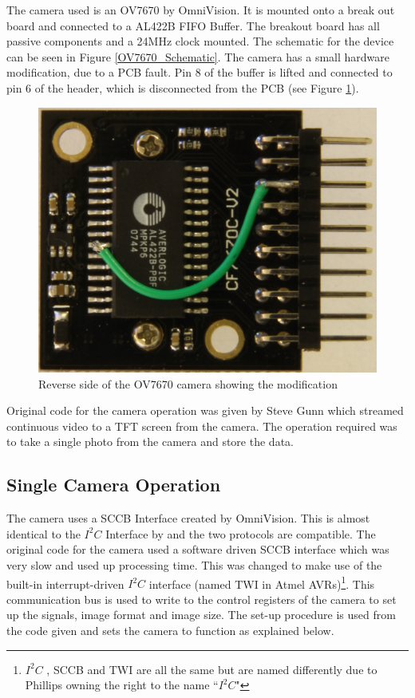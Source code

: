 The camera used is an OV7670 by OmniVision. It is mounted onto a break out board and connected to a AL422B FIFO Buffer. The breakout board has all passive components and a 24MHz clock mounted. The schematic for the device can be seen in Figure \ref{OV7670_Schematic}. The camera has a small hardware modification, due to a PCB fault. Pin 8 of the buffer is lifted and connected to pin 6 of the header, which is disconnected from the PCB (see Figure \ref{fig:OV7670:Mod}).
\begin{figure}
\centering
\includegraphics[width=\textwidth /4]{Figures/OV7670_Back.jpg}
\caption{Reverse side of the OV7670 camera showing the modification}
\label{fig:OV7670:Mod}
\end{figure}
Original code for the camera operation was given by Steve Gunn which streamed continuous video to a TFT screen from the camera. The operation required was to take a single photo from the camera and store the data. 

\subsection{Single Camera Operation}

The camera uses a SCCB Interface \citep{SCCB_Interface} created by OmniVision. This is almost identical to the $I^{2}C$ Interface by \cite{Philips:I2C} and the two protocols are compatible. The original code for the camera used a software driven SCCB interface which was very slow and used up processing time. This was changed to make use of the built-in interrupt-driven $I^{2}C$ interface (named TWI in Atmel AVRs)\footnote{$I^{2}C$ , SCCB and TWI are all the same but are named differently due to Phillips owning the right to the name ``$I^{2}C$"}. This communication bus is used to write to the control registers of the camera to set up the signals, image format and image size. The set-up procedure is used from the code given and sets the camera to function as explained below.

